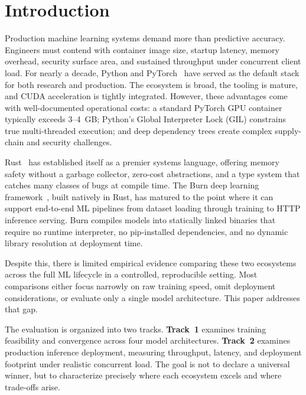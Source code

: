 \documentclass{ieeeaccess}
\begin{document}
\section{Introduction}
\label{sec:intro}

Production machine learning systems demand more than predictive accuracy. Engineers must contend with container image size, startup latency, memory overhead, security surface area, and sustained throughput under concurrent client load. For nearly a decade, Python and PyTorch~\cite{paszke2019pytorch} have served as the default stack for both research and production. The ecosystem is broad, the tooling is mature, and CUDA acceleration is tightly integrated. However, these advantages come with well-documented operational costs: a standard PyTorch GPU container typically exceeds 3--4~GB; Python's Global Interpreter Lock (GIL) constrains true multi-threaded execution; and deep dependency trees create complex supply-chain and security challenges.

Rust~\cite{rust2023} has established itself as a premier systems language, offering memory safety without a garbage collector, zero-cost abstractions, and a type system that catches many classes of bugs at compile time. The Burn deep learning framework~\cite{burn2024}, built natively in Rust, has matured to the point where it can support end-to-end ML pipelines from dataset loading through training to HTTP inference serving. Burn compiles models into statically linked binaries that require no runtime interpreter, no pip-installed dependencies, and no dynamic library resolution at deployment time.

Despite this, there is limited empirical evidence comparing these two ecosystems across the full ML lifecycle in a controlled, reproducible setting. Most comparisons either focus narrowly on raw training speed, omit deployment considerations, or evaluate only a single model architecture. This paper addresses that gap.

The evaluation is organized into two tracks. \textbf{Track~1} examines training feasibility and convergence across four model architectures. \textbf{Track~2} examines production inference deployment, measuring throughput, latency, and deployment footprint under realistic concurrent load. The goal is not to declare a universal winner, but to characterize precisely where each ecosystem excels and where trade-offs arise.
\end{document}
